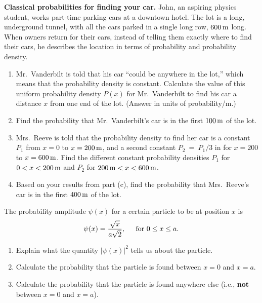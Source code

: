 \begin{problem}
{\bf Classical probabilities for finding your car.}  John, an aspiring
physics student, works part-time parking cars at a downtown hotel.
The lot is a long, underground tunnel, with all the cars parked in a
single long row, $600\,\mbox{m}$ long.  When owners return for their
cars, instead of telling them exactly where to find their cars, he
describes the location in terms of probability and probability
density.
\label{prob:parking_lot_1}
   \begin{enumerate}
   \item Mr.~Vanderbilt is told that his car ``could be anywhere in
     the lot,'' which means that the probability density is constant.
     Calculate the value of this uniform probability density $P(x)$
     for Mr.~Vanderbilt to find his car a distance $x$ from one end of
     the lot.  (Answer in units of probability/m.)
    \item Find the probability that Mr.~Vanderbilt's car is in the first 
     $100\,\mbox{m}$ of the lot.
    \item Mrs.~Reeve is told that the probability density to find her
      car is a constant $P_1$ from $x = 0$ to $x=200\,\mbox{m}$, and
      a second constant \mbox{$P_2$ = $P_1/3$} in for $x=200$ to 
      $x=600\,\mbox{m}$.  Find the different constant probability densities
      $P_1$ for $0 < x < 200\,\mbox{m}$ and $P_2$ for $200\,\mbox{m}
      < x < 600\,\mbox{m}$.
     \item Based on your results from part (c), find the probability
       that Mrs.~Reeve's car is in the first $400\,\mbox{m}$ of the
       lot.
     \end{enumerate}
\end{problem}

\newpage


\begin{problem}
The probability amplitude $\psi(x)$ for a certain particle to be at 
position $x$ is
\[ 
\psi(x) = 
\frac{\sqrt{x}}{a\sqrt{2}}, \hspace{0.2in}\text{for $0\leq x \leq a$.}
\]
\begin{enumerate}
\item Explain what the quantity $|\psi(x)|^2$ tells us about the particle.

\item Calculate the probability that the particle is found between $x=0$ 
and $x = a$. 

\item Calculate the probability that the particle is found anywhere else
(i.e., {\bf not} between $x=0$ and $x=a$).
\end{enumerate}
\end{problem}

